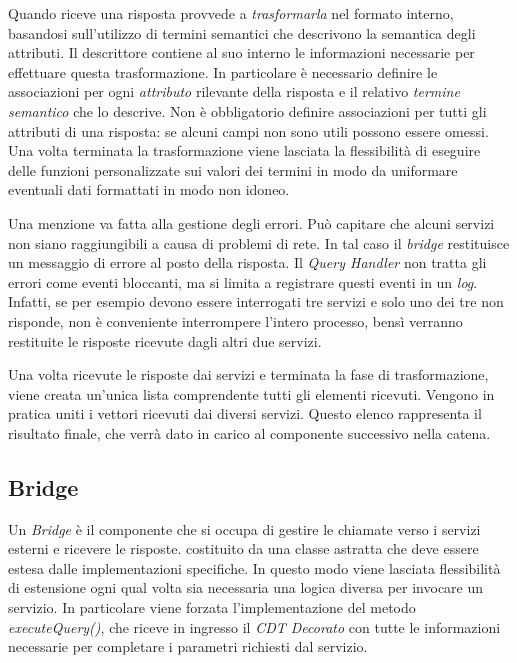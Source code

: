 Quando riceve una risposta provvede a \emph{trasformarla} nel formato interno, basandosi sull'utilizzo di termini semantici che descrivono la semantica degli attributi. Il descrittore contiene al suo interno le informazioni necessarie per effettuare questa trasformazione. In particolare è necessario definire le associazioni per ogni \emph{attributo} rilevante della risposta e il relativo \emph{termine semantico} che lo descrive. Non è obbligatorio definire associazioni per tutti gli attributi di una risposta: se alcuni campi non sono utili possono essere omessi. Una volta terminata la trasformazione viene lasciata la flessibilità di eseguire delle funzioni personalizzate sui valori dei termini in modo da uniformare eventuali dati formattati in modo non idoneo.

Una menzione va fatta alla gestione degli errori. Può capitare che alcuni servizi non siano raggiungibili a causa di problemi di rete. In tal caso il \emph{bridge} restituisce un messaggio di errore al posto della risposta. Il \emph{Query Handler} non tratta gli errori come eventi bloccanti, ma si limita a registrare questi eventi in un \emph{log}. Infatti, se per esempio devono essere interrogati tre servizi e solo uno dei tre non risponde, non è conveniente interrompere l'intero processo, bensì verranno restituite le risposte ricevute dagli altri due servizi.

Una volta ricevute le risposte dai servizi e terminata la fase di trasformazione, viene creata un'unica lista comprendente tutti gli elementi ricevuti. Vengono in pratica uniti i vettori ricevuti dai diversi servizi. Questo elenco rappresenta il risultato finale, che verrà dato in carico al componente successivo nella catena.

\subsection{Bridge\label{sec:bridge}}

Un \emph{Bridge} è il componente che si occupa di gestire le chiamate verso i servizi esterni e ricevere le risposte. \upe costituito da una classe astratta che deve essere estesa dalle implementazioni specifiche. In questo modo viene lasciata flessibilità di estensione ogni qual volta sia necessaria una logica diversa per invocare un servizio. In particolare viene forzata l'implementazione del metodo \emph{executeQuery()}, che riceve in ingresso il \emph{CDT Decorato} con tutte le informazioni necessarie per completare i parametri richiesti dal servizio.

